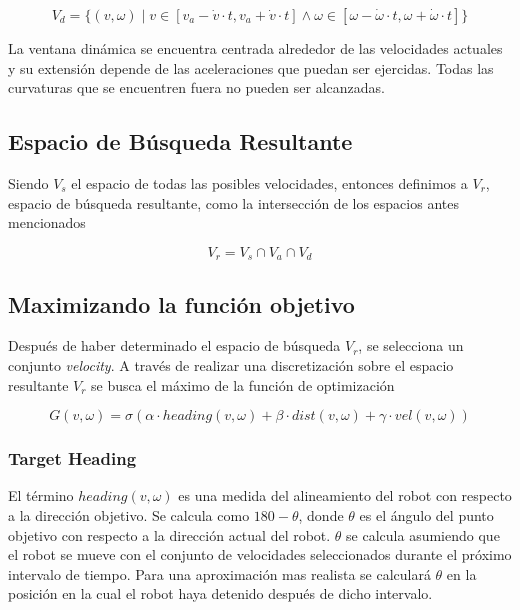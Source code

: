 \documentclass[10pt]{article}
\begin{document}
\begin{equation}
	V_d = 
		\{ (v, \omega) \mid 
			v \in \left[v_a - \dot{v} \cdot t, v_a + \dot{v} \cdot t\right]
			\wedge
			\omega \in \left[\omega - \dot{\omega} \cdot t, \omega + \dot{\omega} \cdot t\right]
		\}
\end{equation}

La ventana dinámica se encuentra centrada alrededor de las velocidades actuales y su extensión depende de las aceleraciones que puedan ser ejercidas. Todas las curvaturas que se encuentren fuera no pueden ser alcanzadas.

\subsection{Espacio de Búsqueda Resultante}

Siendo $V_s$ el espacio de todas las posibles velocidades, entonces definimos a $V_r$, espacio de búsqueda resultante, como la intersección de los espacios antes mencionados

\begin{equation}
	V_r = V_s \cap V_a \cap V_d
\end{equation}

\subsection{Maximizando la función objetivo}

Después de haber determinado el espacio de búsqueda $V_r$, se selecciona un conjunto \emph{velocity}. A través de realizar una discretización sobre el espacio resultante $V_r$ se busca el máximo de la función de optimización

\begin{equation}
	G(v, \omega) = 
			\sigma(\alpha \cdot heading(v, \omega) + \beta \cdot dist(v, 					\omega) + \gamma \cdot vel(v, \omega))
\end{equation}

\subsubsection*{Target Heading}
El término $heading(v, \omega)$ es una medida del alineamiento del robot con respecto a la dirección objetivo. Se calcula como $180 - \theta$, donde $\theta$ es el ángulo del punto objetivo con respecto a la dirección actual del robot. $\theta$ se calcula asumiendo que el robot se mueve con el conjunto de velocidades seleccionados durante el próximo intervalo de tiempo. Para una aproximación mas realista se calculará $\theta$ en la posición en la cual el robot haya detenido después de dicho intervalo.
\end{document}
